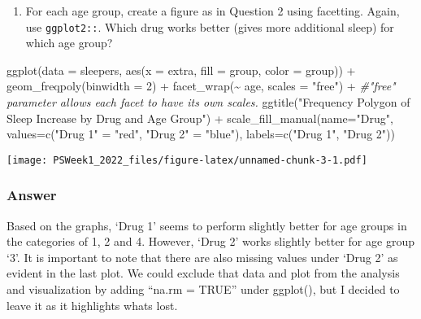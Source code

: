 \documentclass[
]{article}
\newenvironment{Shaded}{\begin{snugshade}}{\end{snugshade}}
\newcommand{\AttributeTok}[1]{\textcolor[rgb]{0.77,0.63,0.00}{#1}}
\newcommand{\CommentTok}[1]{\textcolor[rgb]{0.56,0.35,0.01}{\textit{#1}}}
\newcommand{\DecValTok}[1]{\textcolor[rgb]{0.00,0.00,0.81}{#1}}
\newcommand{\FunctionTok}[1]{\textcolor[rgb]{0.00,0.00,0.00}{#1}}
\newcommand{\NormalTok}[1]{#1}
\newcommand{\OtherTok}[1]{\textcolor[rgb]{0.56,0.35,0.01}{#1}}
\newcommand{\SpecialCharTok}[1]{\textcolor[rgb]{0.00,0.00,0.00}{#1}}
\newcommand{\StringTok}[1]{\textcolor[rgb]{0.31,0.60,0.02}{#1}}
\providecommand{\tightlist}{%
  \setlength{\itemsep}{0pt}\setlength{\parskip}{0pt}}
\begin{document}
\begin{enumerate}
\def\labelenumi{\arabic{enumi}.}
\setcounter{enumi}{2}
\tightlist
\item
  For each age group, create a figure as in Question 2 using facetting.
  Again, use \texttt{ggplot2::}. Which drug works better (gives more
  additional sleep) for which age group?
\end{enumerate}

\begin{Shaded}
\begin{Highlighting}[]
\FunctionTok{ggplot}\NormalTok{(}\AttributeTok{data =}\NormalTok{ sleepers, }\FunctionTok{aes}\NormalTok{(}\AttributeTok{x =}\NormalTok{ extra, }\AttributeTok{fill =}\NormalTok{ group, }\AttributeTok{color =}\NormalTok{ group)) }\SpecialCharTok{+}
  \FunctionTok{geom\_freqpoly}\NormalTok{(}\AttributeTok{binwidth =} \DecValTok{2}\NormalTok{) }\SpecialCharTok{+}
  \FunctionTok{facet\_wrap}\NormalTok{(}\SpecialCharTok{\textasciitilde{}}\NormalTok{ age, }\AttributeTok{scales =} \StringTok{"free"}\NormalTok{) }\SpecialCharTok{+} \CommentTok{\#"free" parameter allows each facet to have its own scales.}
  \FunctionTok{ggtitle}\NormalTok{(}\StringTok{"Frequency Polygon of Sleep Increase by Drug and Age Group"}\NormalTok{) }\SpecialCharTok{+}
  \FunctionTok{scale\_fill\_manual}\NormalTok{(}\AttributeTok{name=}\StringTok{"Drug"}\NormalTok{, }\AttributeTok{values=}\FunctionTok{c}\NormalTok{(}\StringTok{"Drug 1"} \OtherTok{=} \StringTok{"red"}\NormalTok{, }\StringTok{"Drug 2"} \OtherTok{=} \StringTok{"blue"}\NormalTok{), }\AttributeTok{labels=}\FunctionTok{c}\NormalTok{(}\StringTok{"Drug 1"}\NormalTok{, }\StringTok{"Drug 2"}\NormalTok{))}
\end{Highlighting}
\end{Shaded}

\texttt{[image: PSWeek1\_2022\_files/figure-latex/unnamed-chunk-3-1.pdf]}

\hypertarget{answer-1}{%
\subsubsection{Answer}\label{answer-1}}

Based on the graphs, `Drug 1' seems to perform slightly better for age
groups in the categories of 1, 2 and 4. However, `Drug 2' works slightly
better for age group `3'. It is important to note that there are also
missing values under `Drug 2' as evident in the last plot. We could
exclude that data and plot from the analysis and visualization by adding
``na.rm = TRUE'' under ggplot(), but I decided to leave it as it
highlights whats lost.
\end{document}

